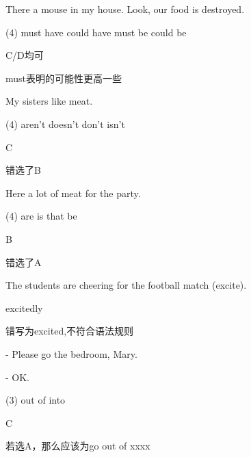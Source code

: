 \begin{question}[tags={xiaoxuect}]
There \blank[width=1cm]{} a mouse in my house. Look, our food is destroyed.

  \begin{tasks}(4)
    \task must have
    \task could have
    \task must be
    \task could be
  \end{tasks}

\end{question}
\begin{solution}
C/D均可

must表明的可能性更高一些
\end{solution}


\begin{question}[tags={xiaoxuect}]
My sisters \blank[width=1cm]{} like meat.

  \begin{tasks}(4)
    \task aren't
    \task doesn't
    \task don't
    \task isn't
  \end{tasks}

\end{question}
\begin{solution}
C

错选了B
\end{solution}


\begin{question}[tags={xiaoxuect}]
Here \blank[width=1cm]{} a lot of meat for the party.

  \begin{tasks}(4)
    \task are
    \task is
    \task that
    \task be
  \end{tasks}

\end{question}
\begin{solution}
B

错选了A
\end{solution}


\begin{question}[tags={xiaoxuect}]
The students are cheering for the football match \blank[width=1cm]{}(excite).

\end{question}
\begin{solution}
excitedly

错写为excited,不符合语法规则
\end{solution}


\begin{question}[tags={xiaoxuect}]
- Please go \blank[width=1cm]{} the bedroom, Mary.

\noindent - OK.

  \begin{tasks}(3)
    \task out
    \task of
    \task into
  \end{tasks}

\end{question}
\begin{solution}
C

若选A，那么应该为go out of xxxx
\end{solution}


